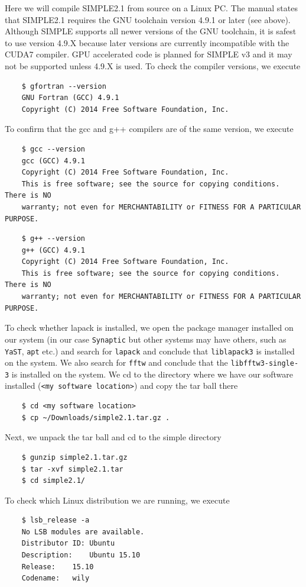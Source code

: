 \documentclass[a4paper,11pt]{article}
\begin{document}
Here we will compile SIMPLE2.1 from source on a Linux PC. The manual states that  SIMPLE2.1 requires the GNU toolchain version 4.9.1 or later (see above). Although SIMPLE supports all newer versions of the GNU toolchain, it is safest to use version 4.9.X because later versions are currently incompatible with the CUDA7 compiler. GPU accelerated code is planned for SIMPLE v3 and it may not be supported unless 4.9.X is used. To check the compiler versions, we execute
\begin{verbatim}
    $ gfortran --version
    GNU Fortran (GCC) 4.9.1
    Copyright (C) 2014 Free Software Foundation, Inc.
\end{verbatim}
To confirm that the gcc and g++ compilers are of the same version, we execute
\begin{verbatim}
    $ gcc --version
    gcc (GCC) 4.9.1
    Copyright (C) 2014 Free Software Foundation, Inc.
    This is free software; see the source for copying conditions.  There is NO
    warranty; not even for MERCHANTABILITY or FITNESS FOR A PARTICULAR PURPOSE.
\end{verbatim}
\begin{verbatim}
    $ g++ --version
    g++ (GCC) 4.9.1
    Copyright (C) 2014 Free Software Foundation, Inc.
    This is free software; see the source for copying conditions.  There is NO
    warranty; not even for MERCHANTABILITY or FITNESS FOR A PARTICULAR PURPOSE.
\end{verbatim}
To check whether lapack is installed, we open the package manager installed on our system (in our case \texttt{Synaptic} but other systems may have others, such as \texttt{YaST}, \texttt{apt} etc.) and search for \texttt{lapack} and conclude that \texttt{liblapack3} is installed on the system. We also search for \texttt{fftw} and conclude that the \texttt{libfftw3-single-3} is installed on the system. We cd to the directory  where we have our software installed (\texttt{<my software location>}) and copy the tar ball there
\begin{verbatim}
    $ cd <my software location>
    $ cp ~/Downloads/simple2.1.tar.gz .
\end{verbatim}
Next, we unpack the tar ball and cd to the simple directory
\begin{verbatim}
    $ gunzip simple2.1.tar.gz
    $ tar -xvf simple2.1.tar
    $ cd simple2.1/
\end{verbatim}
To check which Linux distribution we are running, we execute
\begin{verbatim}
    $ lsb_release -a
    No LSB modules are available.
    Distributor ID: Ubuntu
    Description:    Ubuntu 15.10
    Release:    15.10
    Codename:   wily
\end{verbatim}
\end{document}
